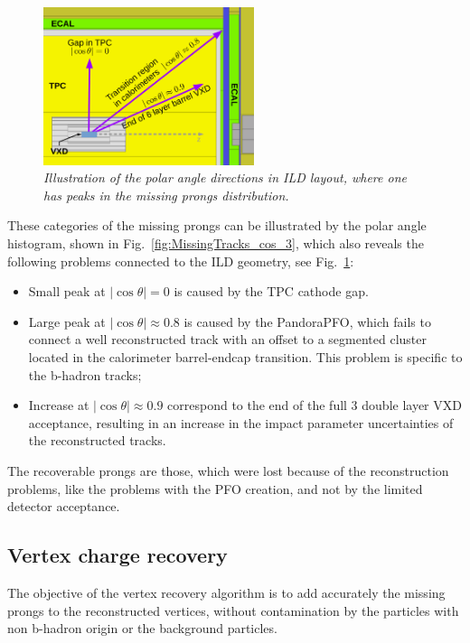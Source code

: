\begin{figure}
	{\centering
		\includegraphics[width=0.55\textwidth]{ILD/graphics/directions.pdf}
		\caption{\sl Illustration of the polar angle directions in ILD layout, where one has peaks in the missing prongs distribution. 
		}
		\label{fig:ILDDirection_3}
	}
\end{figure}

These categories of the missing prongs can be illustrated by the polar angle histogram, shown in Fig.~\ref{fig:MissingTracks_cos_3}, which also reveals the following problems connected to the ILD geometry, see Fig.~\ref{fig:ILDDirection_3}:
\begin{itemize}
\item Small peak at $|\cos\theta| = 0$ is caused by the TPC cathode gap. 
\item Large peak at $|\cos\theta| \approx 0.8$ is caused by the PandoraPFO, which fails to connect a well reconstructed track with an offset to a segmented cluster located in the calorimeter barrel-endcap transition. This problem is specific to the b-hadron tracks;
\item Increase at $|\cos\theta| \approx 0.9$ correspond to the end of the full 3 double layer VXD acceptance, resulting in an increase in the impact parameter uncertainties of the reconstructed tracks. %
\end{itemize}

The recoverable prongs are those, which were lost because of the reconstruction problems, like the problems with the PFO creation, and not by the limited detector acceptance.  

\subsection{Vertex charge recovery}
\label{sec:VtxRecovery}
The objective of the vertex recovery algorithm is to add accurately the missing prongs to the reconstructed vertices, without contamination by the particles with non b-hadron origin or the background particles. 

